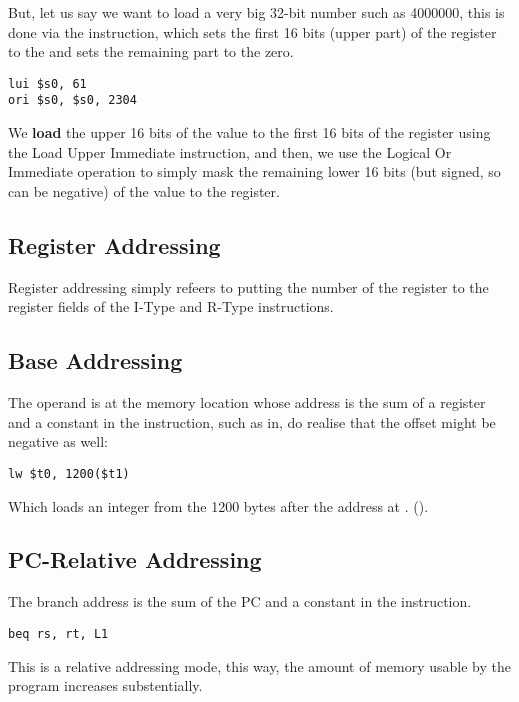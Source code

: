 \documentclass[11pt,a4paper,twocolumn]{book}
\begin{document}
But, let us say we want to load a very big 32-bit number such as 4000000, this is done via the  instruction, which sets the first 16 bits (upper part) of the register  to the  and sets the remaining part to the zero.

\begin{lstlisting}
lui $s0, 61
ori $s0, $s0, 2304
\end{lstlisting}

We \textbf{load} the upper 16 bits of the value to the first 16 bits of the  register using the Load Upper Immediate instruction, and then, we use the Logical Or Immediate operation to simply mask the remaining lower 16 bits (but signed, so can be negative) of the value to the register.\\

\subsection{Register Addressing}

Register addressing simply refeers to putting the number of the register to the register fields of the I-Type and R-Type instructions.

\subsection{Base Addressing}

The operand is at the memory location whose address is the sum of a register and a constant in the instruction, such as in, do realise that the offset might be negative as well:

\begin{lstlisting}
lw $t0, 1200($t1)
\end{lstlisting}

Which loads an integer from the 1200 bytes after the address at . ().

\subsection{PC-Relative Addressing}

The branch address is the sum of the PC and a constant in the instruction. 

\begin{lstlisting}
beq rs, rt, L1
\end{lstlisting}

This is a relative addressing mode, this way, the amount of memory usable by the program increases substentially.\\
\end{document}

